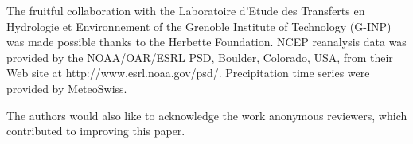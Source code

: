\documentclass{ametsoc}
\begin{document}
The fruitful collaboration with the Laboratoire d'Etude des Transferts en Hydrologie et Environnement of the Grenoble Institute of Technology (G-INP) was made possible thanks to the Herbette Foundation. NCEP reanalysis data was provided by the NOAA/OAR/ESRL PSD, Boulder, Colorado, USA, from their Web site at http://www.esrl.noaa.gov/psd/. Precipitation time series were provided by MeteoSwiss.

The authors would also like to acknowledge the work anonymous reviewers, which contributed to improving this paper.


%






%
%
%


\end{document}
